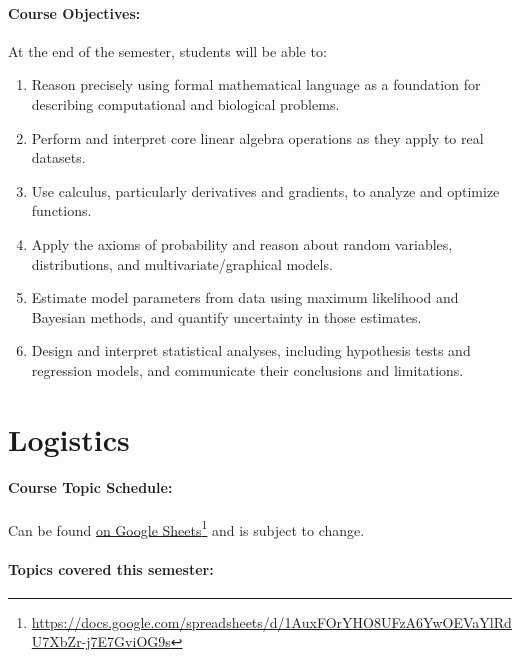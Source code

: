 \documentclass[12pt]{scrartcl}
\begin{document}
\paragraph{Course Objectives:} 
At the end of the semester, students will be able to:
\begin{enumerate}
\item Reason precisely using formal mathematical language as a foundation for describing computational and biological problems.
\item Perform and interpret core linear algebra operations as they apply to real datasets.
\item Use calculus, particularly derivatives and gradients, to analyze and optimize functions.
\item Apply the axioms of probability and reason about random variables, distributions, and multivariate/graphical models.
\item Estimate model parameters from data using maximum likelihood and Bayesian methods, and quantify uncertainty in those estimates.
\item Design and interpret statistical analyses, including hypothesis tests and regression models, and communicate their conclusions and limitations.
\end{enumerate}






\section{Logistics}

\paragraph{Course Topic Schedule:} Can be found \href{https://docs.google.com/spreadsheets/d/1AuxFOrYHO8UFzA6YwOEVaYlRdU7XbZr-j7E7GviOG9s}{on Google Sheets}\footnote{\url{https://docs.google.com/spreadsheets/d/1AuxFOrYHO8UFzA6YwOEVaYlRdU7XbZr-j7E7GviOG9s}}
and is subject to change.

\iffalse
\paragraph{Topics covered this semester:}
\end{document}
